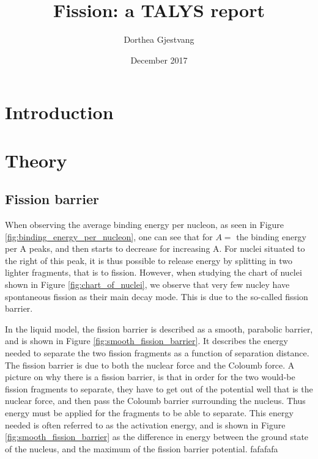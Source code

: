 \documentclass[]{article}
\title{}
\author{}
\begin{document}
	
\title{Fission: a TALYS report}
\author{Dorthea Gjestvang }
\date{December 2017}

\maketitle

\begin{abstract}

\end{abstract}

\section{Introduction}

\section{Theory}
\subsection{Fission barrier}
When observing the average binding energy per nucleon, as seen in Figure \ref{fig:binding_energy_per_nucleon}, one can see that for $A=$ the binding energy per A peaks, and then starts to decrease for increasing A. For nuclei situated to the right of this peak, it is thus possible to release energy by splitting in two lighter fragments, that is to fission. However, when studying the chart of nuclei shown in Figure \ref{fig:chart_of_nuclei}, we observe that very few nucley have spontaneous fission as their main decay mode. This is due to the so-called fission barrier.

 In the liquid model, the fission barrier is described as a smooth, parabolic barrier, and is shown in Figure \ref{fig:smooth_fission_barrier}. It describes the energy needed to separate the two fission fragments as a function of separation distance. The fission barrier is due to both the nuclear force and the Coloumb force. A picture on why there is a fission barrier, is that in order for the two would-be fission fragments to separate, they have to get out of the potential well that is the nuclear force, and then pass the Coloumb barrier surrounding the nucleus. Thus energy must be applied for the fragments to be able to separate. This energy needed is often referred to as the activation energy, and is shown in Figure \ref{fig:smooth_fission_barrier} as the difference in energy between the ground state of the nucleus, and the maximum of the fission barrier potential. fafafafa
\end{document}
